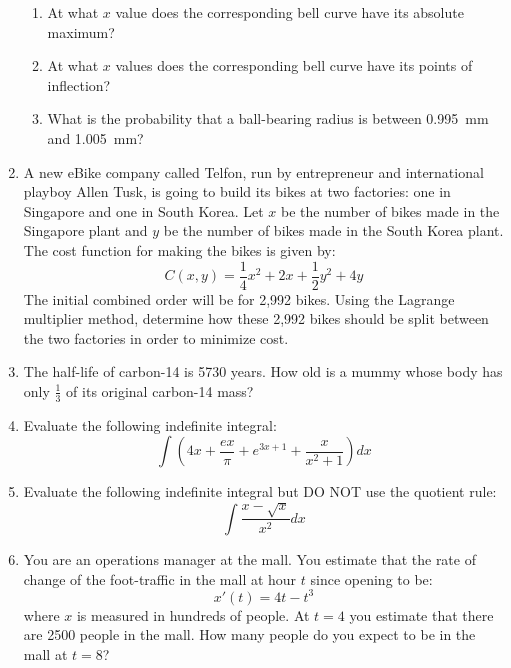 \documentclass[letterpaper,12pt,fleqn]{article}
\begin{document}
\begin{enumerate}[left=0pt]
\begin{enumerate}
  \item At what \(x\) value does the corresponding bell curve have its absolute maximum?

    \vspace{1in}

  \item At what \(x\) values does the corresponding bell curve have its points of inflection?

    \vspace{1in}

  \item What is the probability that a ball-bearing radius is between \SI{0.995}{mm} and \SI{1.005}{mm}?

  \end{enumerate}

  \newpage

\item A new eBike company called Telfon, run by entrepreneur and international playboy Allen Tusk, is going to
  build its bikes at two factories: one in Singapore and one in South Korea.  Let \(x\) be the number of bikes made
  in the Singapore plant and \(y\) be the number of bikes made in the South Korea plant.  The cost function for
  making the bikes is given by:
  \[C(x,y)=\frac{1}{4}x^2+2x+\frac{1}{2}y^2+4y\]
  The initial combined order will be for 2,992 bikes.  Using the Lagrange multiplier method, determine how these
  2,992 bikes should be split between the two factories in order to minimize cost.

  \newpage

\item The half-life of carbon-14 is 5730 years.  How old is a mummy whose body has only \(\frac{1}{3}\) of its
  original carbon-14 mass?

  \vspace{3in}

\item Evaluate the following indefinite integral:
  \[\int\left(4x+\frac{e x}{\pi}+e^{3x+1}+\frac{x}{x^2+1}\right)dx\]

  \newpage

\item Evaluate the following indefinite integral but DO NOT use the quotient rule:
  \[\int\frac{x-\sqrt{x}}{x^2}dx\]

  \vspace{3in}

\item You are an operations manager at the mall.  You estimate that the rate of change of the foot-traffic
  in the mall at hour \(t\) since opening to be:
  \[x'(t)=4t-t^3\]
  where \(x\) is measured in hundreds of people.  At \(t=4\) you estimate that there are 2500 people in the mall.
  How many people do you expect to be in the mall at \(t=8\)?


\end{enumerate}
\end{document}
